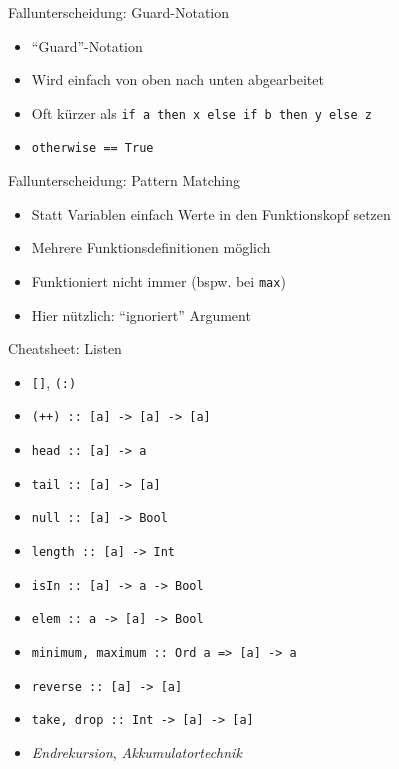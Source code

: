 \documentclass{beamer}
\begin{document}
\begin{frame}{Fallunterscheidung: Guard-Notation}

	\begin{itemize}
		\item \enquote{Guard}-Notation
		\item Wird einfach von oben nach unten abgearbeitet
		\item Oft kürzer als \texttt{if a then x else if b then y else z}
		\pause
		\item \texttt{otherwise == True}
	\end{itemize}
\end{frame}

\begin{frame}{Fallunterscheidung: Pattern Matching}

	\begin{itemize}
		\item Statt Variablen einfach Werte in den Funktionskopf setzen
		\item Mehrere Funktionsdefinitionen möglich
		\item Funktioniert nicht immer (bspw. bei \texttt{max})
                \item Hier nützlich: \texttt{\textunderscore} \enquote{ignoriert} Argument
	\end{itemize}
\end{frame}

\begin{frame}{Cheatsheet: Listen}
	\begin{itemize}
          \item \texttt{[]}, \texttt{(:)}
          \item \texttt{(++) :: [a] -> [a] -> [a]}
          \item \texttt{head :: [a] -> a}
          \item \texttt{tail :: [a] -> [a]}
          \item \texttt{null :: [a] -> Bool}
          \item \texttt{length :: [a] -> Int}
          \item \texttt{isIn :: [a] -> a -> Bool}
          \item \texttt{elem :: a -> [a] -> Bool}
          \item \texttt{minimum, maximum :: Ord a => [a] -> a}
          \item \texttt{reverse :: [a] -> [a]}
          \item \texttt{take, drop :: Int -> [a] -> [a]}
          \item \emph{Endrekursion}, \emph{Akkumulatortechnik}
	\end{itemize}
\end{frame}
\end{document}

